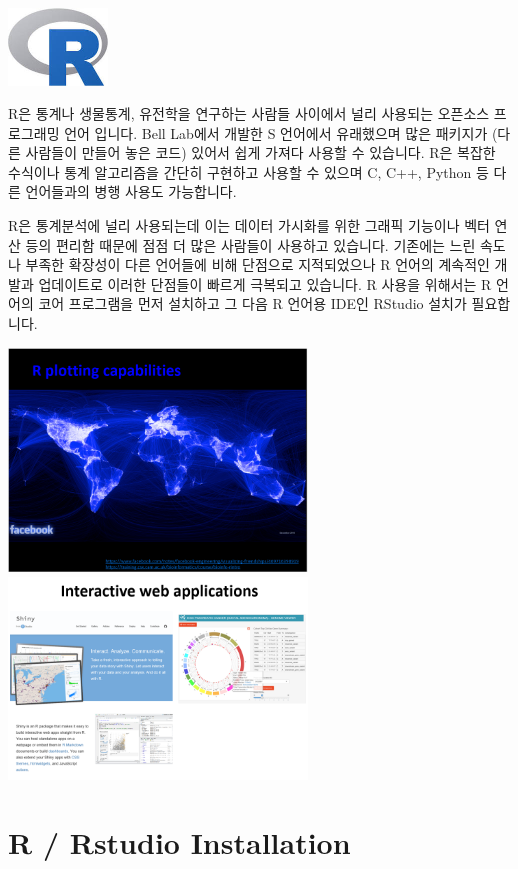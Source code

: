 \documentclass[
]{book}
\begin{document}
\includegraphics[width=1.04167in,height=\textheight]{images/01/r.jpg}

R은 통계나 생물통계, 유전학을 연구하는 사람들 사이에서 널리 사용되는 오픈소스 프로그래밍 언어 입니다. Bell Lab에서 개발한 S 언어에서 유래했으며 많은 패키지가 (다른 사람들이 만들어 놓은 코드) 있어서 쉽게 가져다 사용할 수 있습니다. R은 복잡한 수식이나 통계 알고리즘을 간단히 구현하고 사용할 수 있으며 C, C++, Python 등 다른 언어들과의 병행 사용도 가능합니다.

R은 통계분석에 널리 사용되는데 이는 데이터 가시화를 위한 그래픽 기능이나 벡터 연산 등의 편리함 때문에 점점 더 많은 사람들이 사용하고 있습니다. 기존에는 느린 속도나 부족한 확장성이 다른 언어들에 비해 단점으로 지적되었으나 R 언어의 계속적인 개발과 업데이트로 이러한 단점들이 빠르게 극복되고 있습니다. R 사용을 위해서는 R 언어의 코어 프로그램을 먼저 설치하고 그 다음 R 언어용 IDE인 RStudio 설치가 필요합니다.

\includegraphics[width=3.125in,height=\textheight]{images/01/22.PNG}
\includegraphics[width=3.125in,height=\textheight]{images/01/23.PNG}

\hypertarget{r-rstudio-installation}{%
\section{R / Rstudio Installation}\label{r-rstudio-installation}}
\end{document}
